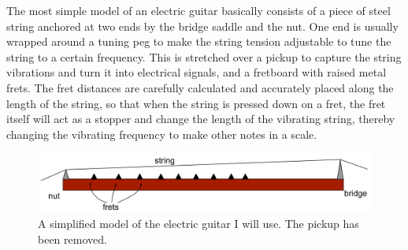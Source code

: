 The most simple model of an electric guitar basically consists of a piece of steel string anchored at two ends by the bridge saddle and the nut. One end is usually wrapped around a tuning peg to make the string tension adjustable to tune the string to a certain frequency. This is stretched over a pickup to capture the string vibrations and turn it into electrical signals, and a fretboard with raised metal frets. The fret distances are carefully calculated and accurately placed along the length of the string, so that when the string is pressed down on a fret, the fret itself will act as a stopper and change the length of the vibrating string, thereby changing the vibrating frequency to make other notes in a scale. 
\begin{figure}[h]
    \includegraphics[width=\textwidth]{./ee/fig1.png}
    \caption{A simplified model of the electric guitar I will use. The pickup has been removed.}\label{fig1}
\end{figure} 
\FloatBarrier